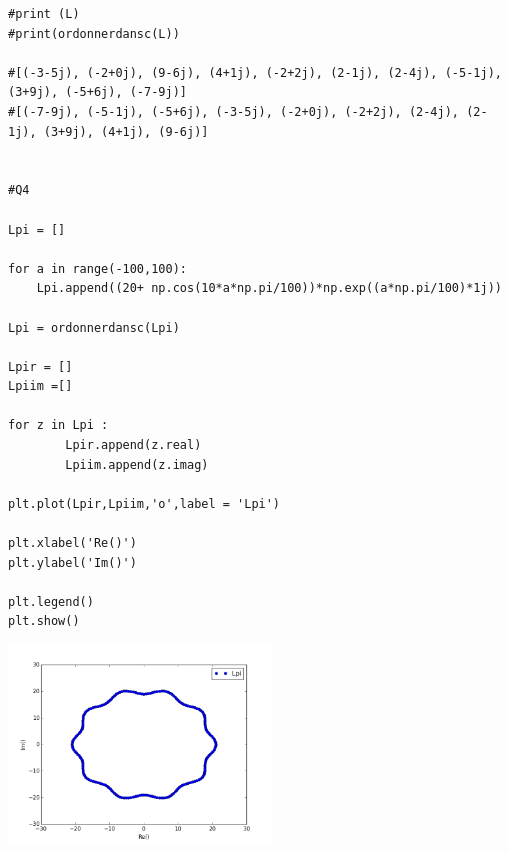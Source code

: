\documentclass[10pt,fleqn]{article} %
\begin{document}
\begin{corrige}
\begin{lstlisting}
#print (L)
#print(ordonnerdansc(L))

#[(-3-5j), (-2+0j), (9-6j), (4+1j), (-2+2j), (2-1j), (2-4j), (-5-1j), (3+9j), (-5+6j), (-7-9j)]
#[(-7-9j), (-5-1j), (-5+6j), (-3-5j), (-2+0j), (-2+2j), (2-4j), (2-1j), (3+9j), (4+1j), (9-6j)]


#Q4

Lpi = []

for a in range(-100,100):
    Lpi.append((20+ np.cos(10*a*np.pi/100))*np.exp((a*np.pi/100)*1j))

Lpi = ordonnerdansc(Lpi)

Lpir = []
Lpiim =[]

for z in Lpi :
        Lpir.append(z.real)
        Lpiim.append(z.imag)
        
plt.plot(Lpir,Lpiim,'o',label = 'Lpi')

plt.xlabel('Re()')
plt.ylabel('Im()')

plt.legend()
plt.show()
\end{lstlisting}
\begin{center}
\includegraphics[width=7cm]{programmes/Exercice_2016_03/figure_1}
\end{center}
\end{corrige}
\end{document}
